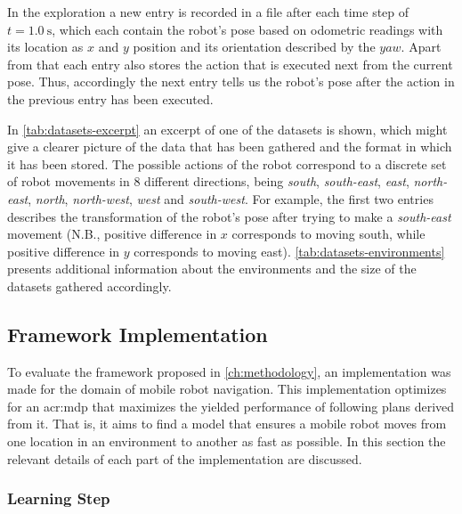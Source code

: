 In the exploration a new entry is recorded in a file after each time step of $t = \SI{1.0}{\second}$, which each contain the robot's pose based on odometric readings with its location as $x$ and $y$ position and its orientation described by the $yaw$.
Apart from that each entry also stores the action that is executed next from the current pose.
Thus, accordingly the next entry tells us the robot's pose after the action in the previous entry has been executed.

In \autoref{tab:datasets-excerpt} an excerpt of one of the datasets is shown, which might give a clearer picture of the data that has been gathered and the format in which it has been stored.
The possible actions of the robot correspond to a discrete set of robot movements in $8$ different directions, being \textit{south}, \textit{south-east}, \textit{east}, \textit{north-east}, \textit{north}, \textit{north-west}, \textit{west} and \textit{south-west}.
For example, the first two entries describes the transformation of the robot's pose after trying to make a \textit{south-east} movement (N.B., positive difference in $x$ corresponds to moving south, while positive difference in $y$ corresponds to moving east).
\autoref{tab:datasets-environments} presents additional information about the environments and the size of the datasets gathered accordingly.


\subsection{Framework Implementation}
\label{sec:implementation}

To evaluate the framework proposed in \autoref{ch:methodology}, an implementation was made for the domain of mobile robot navigation.
This implementation optimizes for an \acrshort{acr:mdp} that maximizes the yielded performance of following plans derived from it. That is, it aims to find a model that ensures a mobile robot moves from one location in an environment to another as fast as possible.
In this section the relevant details of each part of the implementation are discussed.

\subsubsection{Learning Step}
\label{sec:learning-step-robot}


